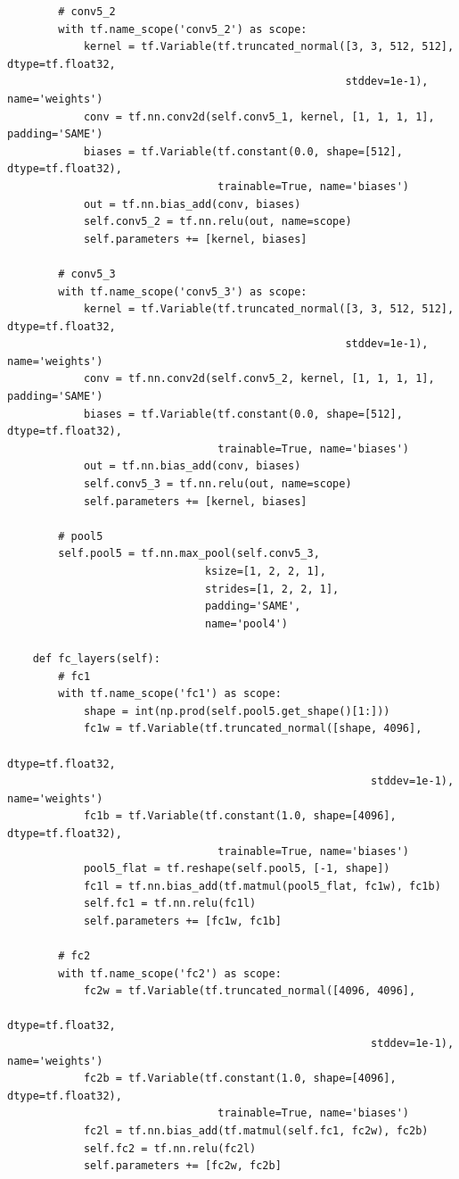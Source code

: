 \documentclass[11pt,a4paper]{article}
\begin{document}
\begin{verbatim}
        # conv5_2
        with tf.name_scope('conv5_2') as scope:
            kernel = tf.Variable(tf.truncated_normal([3, 3, 512, 512], dtype=tf.float32,
                                                     stddev=1e-1), name='weights')
            conv = tf.nn.conv2d(self.conv5_1, kernel, [1, 1, 1, 1], padding='SAME')
            biases = tf.Variable(tf.constant(0.0, shape=[512], dtype=tf.float32),
                                 trainable=True, name='biases')
            out = tf.nn.bias_add(conv, biases)
            self.conv5_2 = tf.nn.relu(out, name=scope)
            self.parameters += [kernel, biases]

        # conv5_3
        with tf.name_scope('conv5_3') as scope:
            kernel = tf.Variable(tf.truncated_normal([3, 3, 512, 512], dtype=tf.float32,
                                                     stddev=1e-1), name='weights')
            conv = tf.nn.conv2d(self.conv5_2, kernel, [1, 1, 1, 1], padding='SAME')
            biases = tf.Variable(tf.constant(0.0, shape=[512], dtype=tf.float32),
                                 trainable=True, name='biases')
            out = tf.nn.bias_add(conv, biases)
            self.conv5_3 = tf.nn.relu(out, name=scope)
            self.parameters += [kernel, biases]

        # pool5
        self.pool5 = tf.nn.max_pool(self.conv5_3,
                               ksize=[1, 2, 2, 1],
                               strides=[1, 2, 2, 1],
                               padding='SAME',
                               name='pool4')

    def fc_layers(self):
        # fc1
        with tf.name_scope('fc1') as scope:
            shape = int(np.prod(self.pool5.get_shape()[1:]))
            fc1w = tf.Variable(tf.truncated_normal([shape, 4096],
                                                         dtype=tf.float32,
                                                         stddev=1e-1), name='weights')
            fc1b = tf.Variable(tf.constant(1.0, shape=[4096], dtype=tf.float32),
                                 trainable=True, name='biases')
            pool5_flat = tf.reshape(self.pool5, [-1, shape])
            fc1l = tf.nn.bias_add(tf.matmul(pool5_flat, fc1w), fc1b)
            self.fc1 = tf.nn.relu(fc1l)
            self.parameters += [fc1w, fc1b]

        # fc2
        with tf.name_scope('fc2') as scope:
            fc2w = tf.Variable(tf.truncated_normal([4096, 4096],
                                                         dtype=tf.float32,
                                                         stddev=1e-1), name='weights')
            fc2b = tf.Variable(tf.constant(1.0, shape=[4096], dtype=tf.float32),
                                 trainable=True, name='biases')
            fc2l = tf.nn.bias_add(tf.matmul(self.fc1, fc2w), fc2b)
            self.fc2 = tf.nn.relu(fc2l)
            self.parameters += [fc2w, fc2b]


\end{verbatim}
\end{document}
